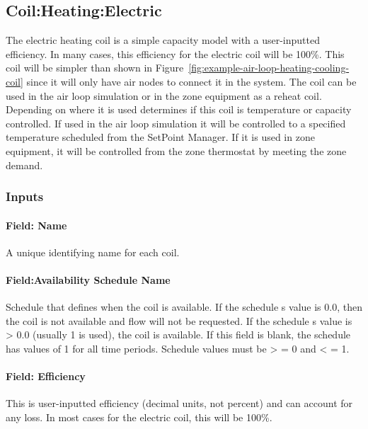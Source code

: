 \subsection{Coil:Heating:Electric}\label{coilheatingelectric}

The electric heating coil is a simple capacity model with a user-inputted efficiency. In many cases, this efficiency for the electric coil will be 100\%. This coil will be simpler than shown in Figure~\ref{fig:example-air-loop-heating-cooling-coil} since it will only have air nodes to connect it in the system. The coil can be used in the air loop simulation or in the zone equipment as a reheat coil. Depending on where it is used determines if this coil is temperature or capacity controlled. If used in the air loop simulation it will be controlled to a specified temperature scheduled from the SetPoint Manager. If it is used in zone equipment, it will be controlled from the zone thermostat by meeting the zone demand.

\subsubsection{Inputs}\label{inputs-3-017}

\paragraph{Field: Name}\label{field-name-3-015}

A unique identifying name for each coil.

\paragraph{Field:Availability Schedule Name}\label{fieldavailability-schedule-name-3}

Schedule that defines when the coil is available. If the schedule s value is 0.0, then the coil is not available and flow will not be requested. If the schedule s value is \textgreater{} 0.0 (usually 1 is used), the coil is available. If this field is blank, the schedule has values of 1 for all time periods. Schedule values must be \textgreater{} = 0 and \textless{} = 1.

\paragraph{Field: Efficiency}\label{field-efficiency}

This is user-inputted efficiency (decimal units, not percent) and can account for any loss. In most cases for the electric coil, this will be 100\%.

